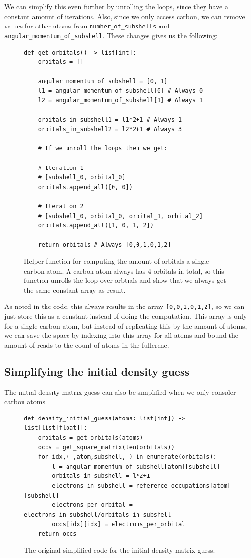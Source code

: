 We can simplify this even further by unrolling the loops, since they have a constant amount of iterations. Also, since we only access carbon, we can remove values for other atoms from \verb|number_of_subshells| and \verb|angular_momentum_of_subshell|. These changes gives us the following:

\begin{figure}[H]
\begin{verbatim}
def get_orbitals() -> list[int]:
    orbitals = []

    angular_momentum_of_subshell = [0, 1]
    l1 = angular_momentum_of_subshell[0] # Always 0
    l2 = angular_momentum_of_subshell[1] # Always 1

    orbitals_in_subshell1 = l1*2+1 # Always 1
    orbitals_in_subshell2 = l2*2+1 # Always 3

    # If we unroll the loops then we get:

    # Iteration 1
    # [subshell_0, orbital_0]
    orbitals.append_all([0, 0])

    # Iteration 2
    # [subshell_0, orbital_0, orbital_1, orbital_2]
    orbitals.append_all([1, 0, 1, 2])

    return orbitals # Always [0,0,1,0,1,2]
\end{verbatim}
\caption{Helper function for computing the amount of orbitals a single carbon atom. A carbon atom always has 4 orbitals in total, so this function unrolls the loop over orbtials and show that we always get the same constant array as result.}
\end{figure}

As noted in the code, this always results in the array \verb|[0,0,1,0,1,2]|, so we can just store this as a constant instead of doing the computation. This array is only for a single carbon atom, but instead of replicating this by the amount of atoms, we can save the space by indexing into this array for all atoms and bound the amount of reads to the count of atoms in the fullerene.

\subsection{Simplifying the initial density guess}

The initial density matrix guess can also be simplified when we only consider carbon atoms.

\begin{figure}[H]
\begin{verbatim}
def density_initial_guess(atoms: list[int]) -> list[list[float]]:
    orbitals = get_orbitals(atoms)
    occs = get_square_matrix(len(orbitals))
    for idx,(_,atom,subshell,_) in enumerate(orbitals):
        l = angular_momentum_of_subshell[atom][subshell] 
        orbitals_in_subshell = l*2+1 
        electrons_in_subshell = reference_occupations[atom][subshell]
        electrons_per_orbital = electrons_in_subshell/orbitals_in_subshell
        occs[idx][idx] = electrons_per_orbital
    return occs
\end{verbatim}
\caption{The original simplified code for the initial density matrix guess.}
\end{figure}

